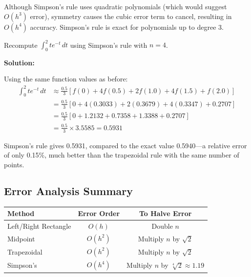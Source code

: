 \begin{keyconceptbox}[title=Why Simpson's Rule is $O(h^4)$]
Although Simpson's rule uses quadratic polynomials (which would suggest $O(h^3)$ error), symmetry causes the cubic error term to cancel, resulting in $O(h^4)$ accuracy. Simpson's rule is exact for polynomials up to degree 3.
\end{keyconceptbox}

\begin{examplebox}[title=Example 11.5: Simpson's Rule Comparison]
Recompute $\int_0^2 te^{-t}\,dt$ using Simpson's rule with $n = 4$.

\textbf{Solution:}

Using the same function values as before:
\begin{align}
\int_0^2 te^{-t}\,dt &\approx \frac{0.5}{3}[f(0) + 4f(0.5) + 2f(1.0) + 4f(1.5) + f(2.0)] \\
&= \frac{0.5}{3}[0 + 4(0.3033) + 2(0.3679) + 4(0.3347) + 0.2707] \\
&= \frac{0.5}{3}[0 + 1.2132 + 0.7358 + 1.3388 + 0.2707] \\
&= \frac{0.5}{3} \times 3.5585 = 0.5931
\end{align}

Simpson's rule gives 0.5931, compared to the exact value 0.5940---a relative error of only 0.15\%, much better than the trapezoidal rule with the same number of points.
\end{examplebox}

\subsection{Error Analysis Summary}

\begin{center}
\begin{tabular}{lcc}
\toprule
\textbf{Method} & \textbf{Error Order} & \textbf{To Halve Error} \\
\midrule
Left/Right Rectangle & $O(h)$ & Double $n$ \\
Midpoint & $O(h^2)$ & Multiply $n$ by $\sqrt{2}$ \\
Trapezoidal & $O(h^2)$ & Multiply $n$ by $\sqrt{2}$ \\
Simpson's & $O(h^4)$ & Multiply $n$ by $\sqrt[4]{2} \approx 1.19$ \\
\bottomrule
\end{tabular}
\end{center}

